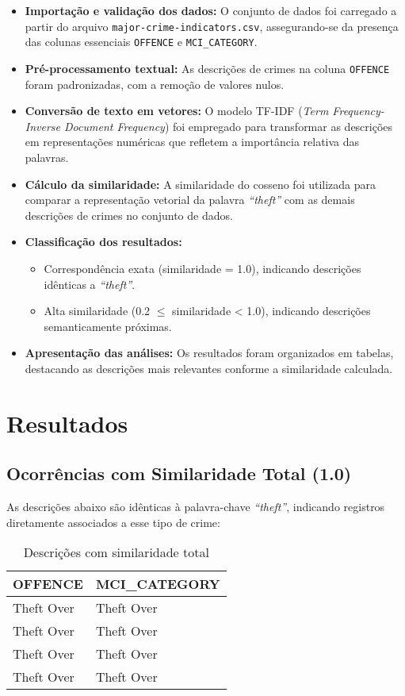 \documentclass[12pt]{article}
\begin{document}
\begin{itemize}
    \item \textbf{Importação e validação dos dados:} O conjunto de dados foi carregado a partir do arquivo \texttt{major-crime-indicators.csv}, assegurando-se da presença das colunas essenciais \texttt{OFFENCE} e \texttt{MCI\_CATEGORY}.
    \item \textbf{Pré-processamento textual:} As descrições de crimes na coluna \texttt{OFFENCE} foram padronizadas, com a remoção de valores nulos.
    \item \textbf{Conversão de texto em vetores:} O modelo TF-IDF (\textit{Term Frequency-Inverse Document Frequency}) foi empregado para transformar as descrições em representações numéricas que refletem a importância relativa das palavras.
    \item \textbf{Cálculo da similaridade:} A similaridade do cosseno foi utilizada para comparar a representação vetorial da palavra \textit{``theft''} com as demais descrições de crimes no conjunto de dados.
    \item \textbf{Classificação dos resultados:}
    \begin{itemize}
        \item Correspondência exata (similaridade = 1.0), indicando descrições idênticas a \textit{``theft''}.
        \item Alta similaridade (0.2 $\leq$ similaridade < 1.0), indicando descrições semanticamente próximas.
    \end{itemize}
    \item \textbf{Apresentação das análises:} Os resultados foram organizados em tabelas, destacando as descrições mais relevantes conforme a similaridade calculada.
\end{itemize}

\section{Resultados}

\subsection{Ocorrências com Similaridade Total (1.0)}

As descrições abaixo são idênticas à palavra-chave \textit{``theft''}, indicando registros diretamente associados a esse tipo de crime:

\begin{table}[h!]
\centering
\caption{Descrições com similaridade total}
\begin{tabular}{ll}
\toprule
\textbf{OFFENCE} & \textbf{MCI\_CATEGORY} \\
\midrule
Theft Over & Theft Over \\
Theft Over & Theft Over \\
Theft Over & Theft Over \\
Theft Over & Theft Over \\
\bottomrule
\end{tabular}
\end{table}
\end{document}
